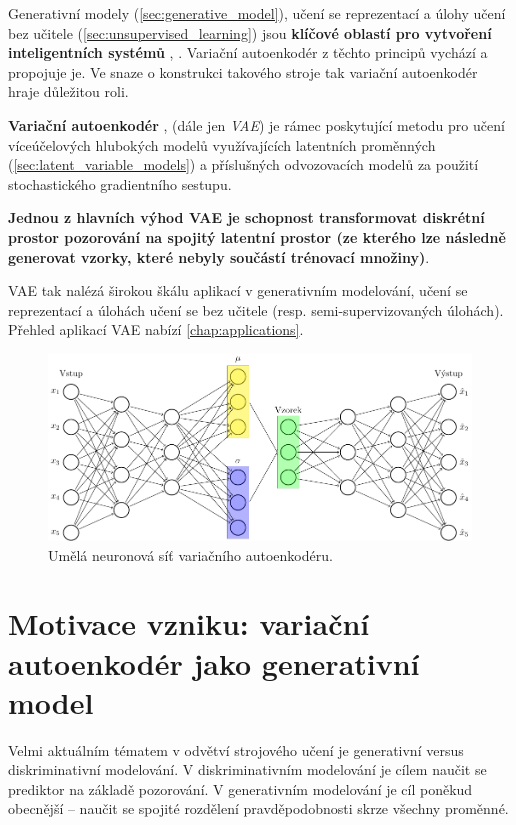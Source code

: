 Generativní modely (\autoref{sec:generative_model}), učení se reprezentací \cite{Bengio2014} a úlohy učení bez učitele (\autoref{sec:unsupervised_learning}) jsou \textbf{klíčové oblastí pro vytvoření inteligentních systémů} \cite{Kingma2019}, \cite{LeCun2022}.
Variační autoenkodér z těchto principů vychází a propojuje je. Ve snaze o konstrukci takového stroje tak variační autoenkodér hraje důležitou roli.

\textbf{Variační autoenkodér} \cite{Kingma2014}, \cite{Rezende2014} (dále jen \emph{VAE})
je rámec poskytující metodu pro učení víceúčelových hlubokých modelů využívajících latentních proměnných (\autoref{sec:latent_variable_models})
a příslušných odvozovacích modelů
za použití stochastického gradientního sestupu. \cite{Kingma2019}

\textbf{Jednou z hlavních výhod VAE je schopnost transformovat \textbf{diskrétní prostor pozorování} na spojitý latentní prostor (ze kterého lze následně generovat vzorky, které nebyly součástí trénovací množiny)}.

VAE tak nalézá širokou škálu aplikací v generativním modelování, učení se reprezentací a úlohách učení se bez učitele (resp. semi-supervizovaných úlohách).
Přehled aplikací VAE nabízí \autoref{chap:applications}.

\begin{figure}[H]
    \includegraphics[width=\textwidth]{figures/vae.pdf}
    \caption{Umělá neuronová síť variačního autoenkodéru.}
    \label{fig:vae_nn}
\end{figure}

\section{Motivace vzniku: variační autoenkodér jako generativní model}
Velmi aktuálním tématem v odvětví strojového učení je generativní versus diskriminativní modelování.
V diskriminativním modelování je cílem naučit se prediktor na základě pozorování.
V generativním modelování je cíl poněkud obecnější – naučit se spojité rozdělení pravděpodobnosti skrze všechny proměnné. \cite{Goodfellow2016}

